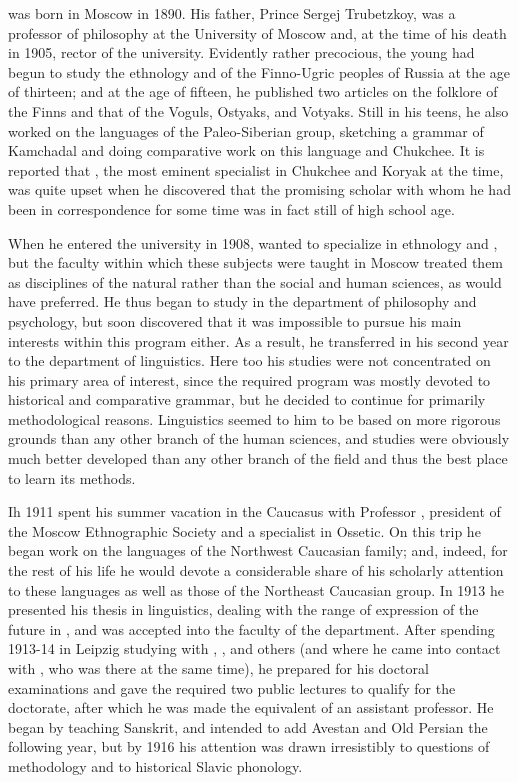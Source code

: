 {\Trubetzkoy} was born in Moscow in 1890. His father, Prince Sergej
Trubetzkoy, was a professor of philosophy at the University of Moscow
and, at the time of his death in 1905, rector of the
university. Evidently rather precocious, the young {\Trubetzkoy} had
begun to study the ethnology and  of the Finno-Ugric
peoples of Russia at the age of thirteen; and at the age of fifteen,
he published two articles on the folklore of the Finns and that of the
Voguls, Ostyaks, and Votyaks. Still in his teens, he also worked on
the languages of the Paleo-Siberian group, sketching a grammar of
Kamchadal and doing comparative work on this language and Chukchee. It
is reported that , the most eminent specialist in Chukchee
and Koryak at the time, was quite upset when he discovered that the
promising scholar with whom he had been in correspondence for some
time was in fact still of high school age.

When he entered the university in 1908, {\Trubetzkoy} wanted to
specialize in ethnology and , but the faculty within which
these subjects were taught in Moscow treated them as disciplines of
the natural rather than the social and human sciences, as {\Trubetzkoy}
would have preferred. He thus began to study in the department of
philosophy and psychology, but soon discovered that it was impossible
to pursue his main interests within this program either. As a result,
he transferred in his second year to the department of
linguistics. Here too his studies were not concentrated on his primary
area of interest, since the required program was mostly devoted to
 historical and comparative grammar, but he decided to
continue for primarily methodological reasons. Linguistics seemed to
him to be based on more rigorous grounds than any other branch of the
human sciences, and  studies were obviously much better
developed than any other branch of the field and thus the best place
to learn its methods.

Ih 1911 {\Trubetzkoy} spent his summer vacation in the Caucasus with
Professor , president of the Moscow Ethnographic Society and
a specialist in Ossetic. On this trip he began work on the languages
of the Northwest Caucasian family; and, indeed, for the rest of his
life he would devote a considerable share of his scholarly attention
to these languages as well as those of the Northeast Caucasian
group. In 1913 he presented his thesis in linguistics, dealing with the
range of expression of the future in , and was accepted
into the faculty of the department. After spending 1913-14 in {Leipzig}
studying with {\Brugmann}, {\Leskien}, and others (and where he came into
contact with , who was there at the same time), he
prepared for his doctoral examinations and gave the required two
public lectures to qualify for the doctorate, after which he was made
the equivalent of an assistant professor. He began by teaching
{Sanskrit}, and intended to add Avestan and Old Persian the following
year, but by 1916 his attention was drawn irresistibly to questions of
methodology and to historical Slavic phonology.

